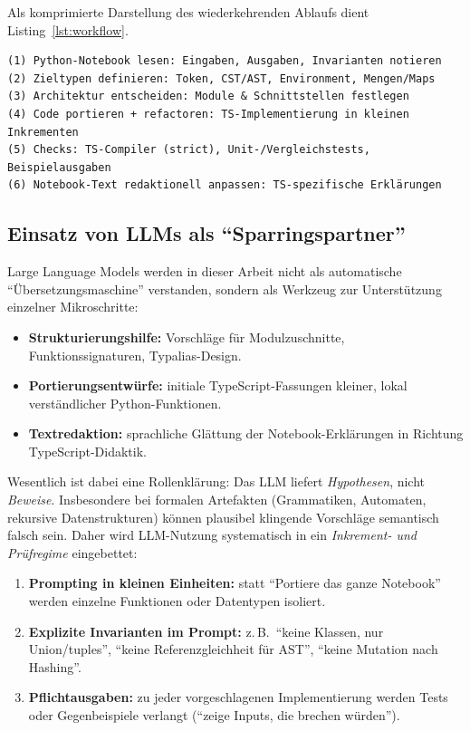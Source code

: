\noindent
Als komprimierte Darstellung des wiederkehrenden Ablaufs dient Listing~\ref{lst:workflow}.

\begin{verbatim}
(1) Python-Notebook lesen: Eingaben, Ausgaben, Invarianten notieren
(2) Zieltypen definieren: Token, CST/AST, Environment, Mengen/Maps
(3) Architektur entscheiden: Module & Schnittstellen festlegen
(4) Code portieren + refactoren: TS-Implementierung in kleinen Inkrementen
(5) Checks: TS-Compiler (strict), Unit-/Vergleichstests, Beispielausgaben
(6) Notebook-Text redaktionell anpassen: TS-spezifische Erklärungen
\end{verbatim}
\label{lst:workflow}

\subsection{Einsatz von LLMs als \enquote{Sparringspartner}}
\label{subsec:methodik_llm}

Large Language Models werden in dieser Arbeit nicht als automatische \enquote{Übersetzungsmaschine} verstanden, sondern als Werkzeug zur Unterstützung einzelner Mikroschritte:
\begin{itemize}
    \item \textbf{Strukturierungshilfe:} Vorschläge für Modulzuschnitte, Funktionssignaturen, Typalias-Design.
    \item \textbf{Portierungsentwürfe:} initiale TypeScript-Fassungen kleiner, lokal verständlicher Python-Funktionen.
    \item \textbf{Textredaktion:} sprachliche Glättung der Notebook-Erklärungen in Richtung TypeScript-Didaktik.
\end{itemize}

\noindent
Wesentlich ist dabei eine Rollenklärung: Das LLM liefert \emph{Hypothesen}, nicht \emph{Beweise}. Insbesondere bei formalen Artefakten (Grammatiken, Automaten, rekursive Datenstrukturen) können plausibel klingende Vorschläge semantisch falsch sein. Daher wird LLM-Nutzung systematisch in ein \emph{Inkrement- und Prüfregime} eingebettet:
\begin{enumerate}
    \item \textbf{Prompting in kleinen Einheiten:} statt \enquote{Portiere das ganze Notebook} werden einzelne Funktionen oder Datentypen isoliert.
    \item \textbf{Explizite Invarianten im Prompt:} z.\,B.\ \enquote{keine Klassen, nur Union/tuples}, \enquote{keine Referenzgleichheit für AST}, \enquote{keine Mutation nach Hashing}.
    \item \textbf{Pflichtausgaben:} zu jeder vorgeschlagenen Implementierung werden Tests oder Gegenbeispiele verlangt (\enquote{zeige Inputs, die brechen würden}).
\end{enumerate}

